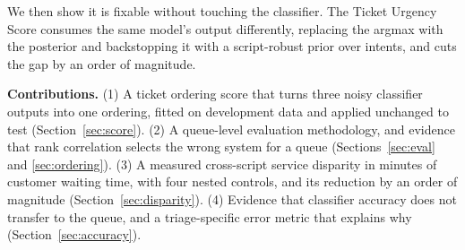 We then show it is fixable without touching the classifier. The Ticket Urgency
Score consumes the same model's output differently, replacing the argmax with the
posterior and backstopping it with a script-robust prior over intents, and cuts
the gap by an order of magnitude.

\textbf{Contributions.} (1) A ticket ordering score that turns three noisy
classifier outputs into one ordering, fitted on development data and applied
unchanged to test (Section~\ref{sec:score}). (2) A queue-level evaluation
methodology, and evidence that rank correlation selects the wrong system for a
queue (Sections~\ref{sec:eval} and \ref{sec:ordering}). (3) A measured
cross-script service disparity in minutes of customer waiting time, with four
nested controls, and its reduction by an order of magnitude
(Section~\ref{sec:disparity}). (4) Evidence that classifier accuracy does not
transfer to the queue, and a triage-specific error metric that explains why
(Section~\ref{sec:accuracy}).
